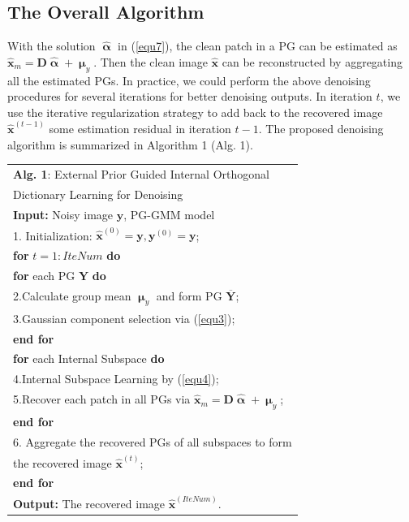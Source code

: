 \documentclass[10pt,twocolumn,letterpaper]{article}
\begin{document}
\subsection{The Overall Algorithm}
With the solution $\hat{\boldsymbol{\upalpha}}$ in (\ref{equ7}), the clean patch in a PG can be estimated as $\hat{\mathbf{x}}_{m}=\mathbf{D}\hat{\boldsymbol{\upalpha}}+\boldsymbol{\upmu}_{y}$. Then the clean image $\hat{\mathbf{x}}$ can be reconstructed by aggregating all the estimated PGs. In practice, we could perform the above denoising procedures for several iterations for better denoising outputs. In iteration $t$, we use the iterative regularization strategy \cite{osher2005iterative} to add back to the recovered image $\hat{\mathbf{x}}^{(t-1)}$ some estimation residual in iteration $t-1$. The proposed denoising algorithm is summarized in Algorithm 1 (Alg. 1).
\begin{table}
\label{alg1}
\begin{tabular}{l}
\hline
\textbf{Alg. 1}: External Prior Guided Internal Orthogonal 
\\
\quad \quad \quad Dictionary Learning for Denoising
\\
\hline
\textbf{Input:} Noisy image $\mathbf{y}$, PG-GMM model
\\
1. Initialization: $\hat{\mathbf{x}}^{(0)}=\mathbf{y},\mathbf{y}^{(0)}=\mathbf{y}$;
\\
\textbf{for} $t = 1:IteNum$ \textbf{do}
\\
\quad\textbf{for} each PG $\mathbf{Y}$ \textbf{do}
\\
2.\quad Calculate group mean $\boldsymbol{\upmu}_{y}$ and form PG $\mathbf{\overline{Y}}$;
\\
3.\quad Gaussian component selection via (\ref{equ3});
\\
\quad\textbf{end for}
\\
\quad\textbf{for} each Internal Subspace \textbf{do}
\\
4.\quad Internal Subspace Learning by (\ref{equ4});
\\
5.\quad Recover each patch in all PGs via $\hat{\mathbf{x}}_{m}=\mathbf{D}\hat{\boldsymbol{\upalpha}}+\boldsymbol{\upmu}_{y}$;
\\
\quad\textbf{end for}
\\
6. Aggregate the recovered PGs of all subspaces to form
\\
\quad the recovered image $\hat{\mathbf{x}}^{(t)}$;
\\
\textbf{end for}
\\
\textbf{Output:} The recovered image $\hat{\mathbf{x}}^{(IteNum)}$.\\
\hline
\end{tabular}
\end{table}
\end{document}
